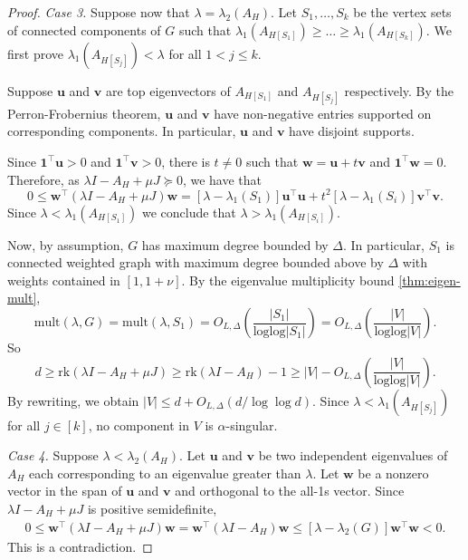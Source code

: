 \documentclass[reqno, 11pt]{amsart}
\theoremstyle{definition}
\theoremstyle{remark}
\begin{document}
\begin{proof}
\textit{Case 3.} Suppose  now that $\lambda = \lambda_2(A_H)$. Let $S_1, \ldots, S_k$ be the vertex sets of connected components of $G$ such that $\lambda_1(A_{H[S_1]}) \geq \ldots \geq \lambda_1(A_{H[S_k]})$. We first prove $\lambda_1(A_{H[S_j]}) < \lambda$ for all $1 < j \leq k$. 
			
			Suppose $\bm u$ and $\bm v$ are top eigenvectors of $A_{H[S_1]}$ and $A_{H[S_j]}$ respectively. By the Perron-Frobernius theorem, $\bm u$ and $\bm v$ have non-negative entries supported on corresponding components. In particular, $\bm u$ and $\bm v$ have disjoint supports.
			
			
			Since $\bm 1^\intercal \bm u > 0$ and $\bm 1^\intercal \bm v > 0$, there is $t \neq 0$ such that $\bm w =\bm  u + t\bm v$ and $\bm 1^\intercal  \bm w = 0$. Therefore, as $\lambda I - A_H + \mu J \succeq 0$, we have that
				\[
					0 \leq \bm w^\intercal(\lambda I - A_H + \mu J) \bm w = [\lambda - \lambda_1(S_1)]\bm u^\intercal \bm u + t^2[\lambda - \lambda_1(S_i)] \bm v^\intercal \bm v.
				\]
			Since $\lambda < \lambda_1(A_{H[S_1]})$ we conclude that $\lambda > \lambda_1(A_{H[S_i]})$.
			
			Now, by assumption, $G$ has maximum degree bounded by $\Delta$. In particular, $S_1$ is connected weighted graph with maximum degree bounded above by $\Delta$ with weights contained in $[1, 1+\nu]$. By the eigenvalue multiplicity bound \cref{thm:eigen-mult},
				\[
					\mathrm{mult}(\lambda, G) = \mathrm{mult}(\lambda, S_1) = O_{L,\Delta}\left(\frac{|S_1|}{\mathrm{loglog} |S_1|}\right) = O_{L,\Delta}\left(\frac{|V|}{\mathrm{loglog} |V|}\right).
				\]
So
				\[
					d \geq \mathrm{rk}(\lambda I - A_H + \mu J) \geq \mathrm{rk}(\lambda I - A_H) - 1 \geq |V| - O_{L,\Delta}\left(\frac{|V|}{\mathrm{loglog} |V|}\right).
				\]
			By rewriting, we obtain $|V| \leq d + O_{L,\Delta}\left(d/ \log \log d\right)$. Since  $\lambda < \lambda_1(A_{H[S_j]})$ for all $j \in [k]$, no component in $V$ is $\alpha$-singular.
			
	
			
\textit{Case 4.} Suppose $\lambda < \lambda_2(A_{H})$. Let $\bm u$ and $\bm v$ be two independent eigenvalues of $A_H$ each corresponding to an eigenvalue greater than $\lambda$.
Let $\bm w$ be a nonzero vector in the span of $\bm u$ and $\bm v$ and orthogonal to the all-1s vector.
Since $\lambda I - A_H + \mu J$ is positive semidefinite,
				\begin{align*}
					0\leq  \bm w^\intercal (\lambda I - A_H + \mu J)\bm w 
     = \bm w^\intercal (\lambda I - A_H)\bm w  
     \leq [\lambda - \lambda_2(G)]\bm w^\intercal \bm w 
     < 0.
				\end{align*}
			This is a contradiction.
\end{proof}
\end{document}
